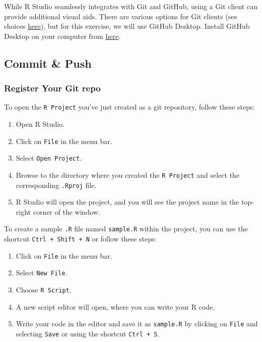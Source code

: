 \documentclass[
]{article}
\providecommand{\tightlist}{%
  \setlength{\itemsep}{0pt}\setlength{\parskip}{0pt}}
\begin{document}
While R Studio seamlessly integrates with Git and GitHub, using a Git client can provide additional visual aids. There are various options for Git clients (see choices \href{https://happygitwithr.com/git-client.html}{here}), but for this exercise, we will use GitHub Desktop. Install GitHub Desktop on your computer from \href{https://desktop.github.com/}{here}.

\hypertarget{commit-push}{%
\subsection{Commit \& Push}\label{commit-push}}

\hypertarget{register-your-git-repo}{%
\subsubsection{Register Your Git repo}\label{register-your-git-repo}}

To open the \texttt{R\ Project} you've just created as a git repository, follow these steps:

\begin{enumerate}
\def\labelenumi{\arabic{enumi}.}
\tightlist
\item
  Open R Studio.
\item
  Click on \texttt{File} in the menu bar.
\item
  Select \texttt{Open\ Project}.
\item
  Browse to the directory where you created the \texttt{R\ Project} and select the corresponding \texttt{.Rproj} file.
\item
  R Studio will open the project, and you will see the project name in the top-right corner of the window.
\end{enumerate}

To create a sample \texttt{.R} file named \texttt{sample.R} within the project, you can use the shortcut \texttt{Ctrl\ +\ Shift\ +\ N} or follow these steps:

\begin{enumerate}
\def\labelenumi{\arabic{enumi}.}
\tightlist
\item
  Click on \texttt{File} in the menu bar.
\item
  Select \texttt{New\ File}.
\item
  Choose \texttt{R\ Script}.
\item
  A new script editor will open, where you can write your R code.
\item
  Write your code in the editor and save it as \texttt{sample.R} by clicking on \texttt{File} and selecting \texttt{Save} or using the shortcut \texttt{Ctrl\ +\ S}.
\end{enumerate}
\end{document}
